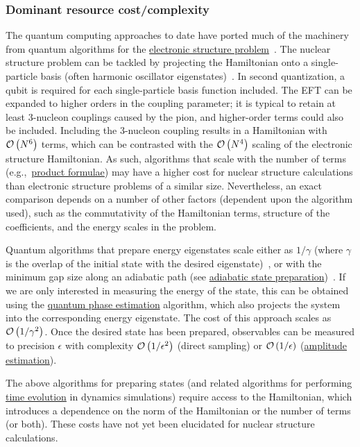 \begin{refsection}
\subsubsection*{Dominant resource cost/complexity}
The quantum computing approaches to date have ported much of the machinery from quantum algorithms for the \hyperref[appl:ElectronicStructure]{electronic structure problem}~\cite{stevenson2023QuantumComputingNuclear}. The nuclear structure problem can be tackled by projecting the Hamiltonian onto a single-particle basis (often harmonic oscillator eigenstates)~\cite{hergert2020AbInitioNuclear}. In second quantization, a qubit is required for each single-particle basis function included. The EFT can be expanded to higher orders in the coupling parameter; it is typical to retain at least 3-nucleon couplings caused by the pion, and higher-order terms could also be included. Including the 3-nucleon coupling results in a Hamiltonian with $\mathcal{O}\left( N^6 \right)$ terms, which can be contrasted with the $\mathcal{O}\left( N^4 \right)$ scaling of the electronic structure Hamiltonian. As such, algorithms that scale with the number of terms (e.g.,~\hyperref[prim:ProductFormulae]{product formulae}) may have a higher cost for nuclear structure calculations than electronic structure problems of a similar size. Nevertheless, an exact comparison depends on a number of other factors (dependent upon the algorithm used), such as the commutativity of the Hamiltonian terms, structure of the coefficients, and the energy scales in the problem.

Quantum algorithms that prepare energy eigenstates scale either as $1/\gamma$ (where $\gamma$ is the overlap of the initial state with the desired eigenstate)~\cite{lin2020NearOptimalGroundState}, or with the minimum gap size along an adiabatic path (see \hyperref[prim:QuantumAdiabaticAlgorithm]{adiabatic state preparation})~\cite{wan2020FastDigitalMethodsForAdiabatic}. If we are only interested in measuring the energy of the state, this can be obtained using the \hyperref[prim:QPE]{quantum phase estimation} algorithm, which also projects the system into the corresponding energy eigenstate. The cost of this approach scales as $\mathcal{O}\left( 1/\gamma^2 \right)$. Once the desired state has been prepared, observables can be measured to precision $\epsilon$ with complexity $\mathcal{O}\left( 1/\epsilon^2 \right)$ (direct sampling) or $\mathcal{O}\left( 1/\epsilon \right)$ (\hyperref[prim:AmpEst]{amplitude estimation}).


The above algorithms for preparing states (and related algorithms for performing \hyperref[prim:HamiltonianSimulation]{time evolution} in dynamics simulations) require access to the Hamiltonian, which introduces a dependence on the norm of the Hamiltonian or the number of terms (or both). These costs have not yet been elucidated for nuclear structure calculations.




\end{refsection}

